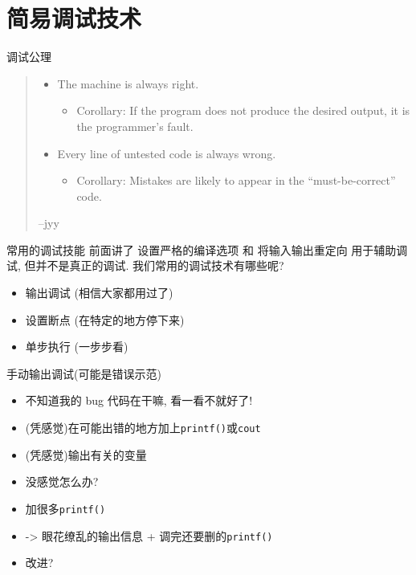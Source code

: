 \section{简易调试技术}\label{sec:简易调试技术}

{
\begin{frame}[fragile]{调试公理}
    \begin{quote}
        \begin{itemize}
            \item The machine is always right.
            \begin{itemize}
                \item Corollary: If the program does not produce the desired output, it is the programmer's fault.
            \end{itemize}
            \emptyline
            \item Every line of untested code is always wrong.
            \begin{itemize}
                \item Corollary: Mistakes are likely to appear in the ``must-be-correct'' code.
            \end{itemize}
        \end{itemize}
        \emptyline
        \hspace*{\fill} --jyy
    \end{quote}
\end{frame}
}

\begin{frame}[fragile]{常用的调试技能}
    前面讲了 设置严格的编译选项 和 将输入输出重定向 用于辅助调试, 但并不是真正的调试.
    我们常用的调试技术有哪些呢?
    \begin{itemize}[<+- | alert@+>]
        \item 输出调试 (相信大家都用过了)
        \item 设置断点 (在特定的地方停下来)
        \item 单步执行 (一步步看)
    \end{itemize}
\end{frame}

\begin{frame}[fragile]{手动输出调试(可能是错误示范)}
    \begin{itemize}[<+- | alert@+>]
        \item 不知道我的 bug 代码在干嘛, 看一看不就好了!
        \item (凭感觉)在可能出错的地方加上\texttt{printf()}或\texttt{cout}
        \item (凭感觉)输出有关的变量
        \item 没感觉怎么办?
        \item 加很多\texttt{printf()}
        \item -> 眼花缭乱的输出信息 + 调完还要删的\texttt{printf()}
        \item 改进?
    \end{itemize}
\end{frame}

